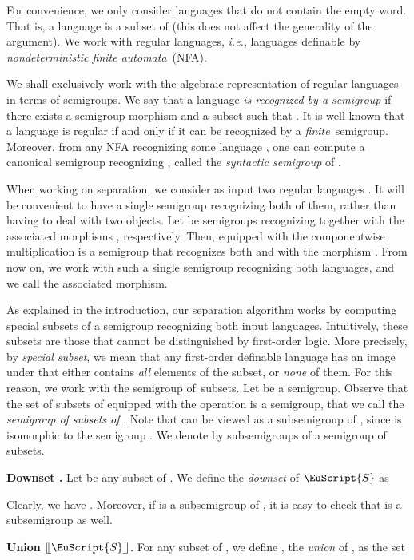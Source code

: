 \documentclass{CSML}
\newcommand\Ss{\ensuremath{\EuScript{S}}\xspace}
\newcommand{\unclos}[1]{\ensuremath{\llfloor{#1}\rrfloor}\xspace}
\theoremstyle{plain}
\begin{document}
For convenience, we only consider languages that do not contain the
empty word. That is, a language is a subset of  (this does not
affect the generality of the argument). We work with
regular languages, \emph{i.e.}, languages definable by
\emph{nondeterministic finite automata}~(NFA).

We shall exclusively work with the algebraic representation of regular
languages in terms of semigroups.  We say that a language \emph{ is
  recognized by a semigroup } if there exists a semigroup
morphism  and a subset 
such that . It is well known that a language is
regular if and only if it can be recognized by a
\emph{finite}~semigroup. Moreover, from any NFA recognizing some
language , one can compute a canonical semigroup recognizing ,
called the \emph{syntactic semigroup} of .

When working on separation, we consider as input two regular languages
. It will be convenient to have a single semigroup
recognizing both of them, rather than having to deal with two
objects. Let  be semigroups recognizing  together
with the associated morphisms , respectively. Then,  equipped with the componentwise multiplication  is a semigroup that recognizes both  and 
with the morphism .
From now on, we work with such a single semigroup recognizing both
languages, and we call  the associated morphism.

\medskip
{} As explained in the
introduction, our separation algorithm works by computing special
subsets of a semigroup recognizing both input languages. Intuitively,
these subsets are those that cannot be distinguished by first-order
logic. More precisely, by \emph{special subset}, we mean that any first-order
definable language has an image under  that either contains
\emph{all} elements of the subset, or \emph{none} of them. For this
reason, we work with the semigroup of~subsets.
\smallskip
Let  be a semigroup. Observe that the set  of subsets of
 equipped with the operation  is a semigroup, that we call the
\emph{semigroup of subsets of }. Note that  can be viewed as a
subsemigroup of , since  is isomorphic to the semigroup
.
We denote by  subsemigroups of a
semigroup of subsets.

\smallskip\noindent\textbf{Downset .} Let  be any subset of . We define the \emph{downset}  of \Ss as

Clearly, we have . Moreover, if  is a
subsemigroup of , it is easy to check that  is a
subsemigroup as well.

\smallskip\noindent\textbf{Union \unclos{\Ss}.} For  any subset of , we define , the
\emph{union} of , as the set
\end{document}
